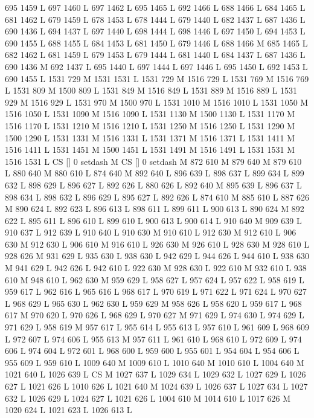 {{{{{{{{{{{{{{{{{{{{{{{{{{{695 1459 L
697 1460 L
697 1462 L
695 1465 L
692 1466 L
688 1466 L
684 1465 L
681 1462 L
679 1459 L
678 1453 L
678 1444 L
679 1440 L
682 1437 L
687 1436 L
690 1436 L
694 1437 L
697 1440 L
698 1444 L
698 1446 L
697 1450 L
694 1453 L
690 1455 L
688 1455 L
684 1453 L
681 1450 L
679 1446 L
688 1466 M 685 1465 L
682 1462 L
681 1459 L
679 1453 L
679 1444 L
681 1440 L
684 1437 L
687 1436 L
690 1436 M 692 1437 L
695 1440 L
697 1444 L
697 1446 L
695 1450 L
692 1453 L
690 1455 L
1531 729 M 1531 1531 L
1531 729 M 1516 729 L
1531 769 M 1516 769 L
1531 809 M 1500 809 L
1531 849 M 1516 849 L
1531 889 M 1516 889 L
1531 929 M 1516 929 L
1531 970 M 1500 970 L
1531 1010 M 1516 1010 L
1531 1050 M 1516 1050 L
1531 1090 M 1516 1090 L
1531 1130 M 1500 1130 L
1531 1170 M 1516 1170 L
1531 1210 M 1516 1210 L
1531 1250 M 1516 1250 L
1531 1290 M 1500 1290 L
1531 1331 M 1516 1331 L
1531 1371 M 1516 1371 L
1531 1411 M 1516 1411 L
1531 1451 M 1500 1451 L
1531 1491 M 1516 1491 L
1531 1531 M 1516 1531 L
CS [] 0 setdash M
CS [] 0 setdash M
872 610 M 879 640 M 879 610 L
880 640 M 880 610 L
874 640 M 892 640 L
896 639 L
898 637 L
899 634 L
899 632 L
898 629 L
896 627 L
892 626 L
880 626 L
892 640 M 895 639 L
896 637 L
898 634 L
898 632 L
896 629 L
895 627 L
892 626 L
874 610 M 885 610 L
887 626 M 890 624 L
892 623 L
896 613 L
898 611 L
899 611 L
900 613 L
890 624 M 892 622 L
895 611 L
896 610 L
899 610 L
900 613 L
900 614 L
910 640 M 909 639 L
910 637 L
912 639 L
910 640 L
910 630 M 910 610 L
912 630 M 912 610 L
906 630 M 912 630 L
906 610 M 916 610 L
926 630 M 926 610 L
928 630 M 928 610 L
928 626 M 931 629 L
935 630 L
938 630 L
942 629 L
944 626 L
944 610 L
938 630 M 941 629 L
942 626 L
942 610 L
922 630 M 928 630 L
922 610 M 932 610 L
938 610 M 948 610 L
962 630 M 959 629 L
958 627 L
957 624 L
957 622 L
958 619 L
959 617 L
962 616 L
965 616 L
968 617 L
970 619 L
971 622 L
971 624 L
970 627 L
968 629 L
965 630 L
962 630 L
959 629 M 958 626 L
958 620 L
959 617 L
968 617 M 970 620 L
970 626 L
968 629 L
970 627 M 971 629 L
974 630 L
974 629 L
971 629 L
958 619 M 957 617 L
955 614 L
955 613 L
957 610 L
961 609 L
968 609 L
972 607 L
974 606 L
955 613 M 957 611 L
961 610 L
968 610 L
972 609 L
974 606 L
974 604 L
972 601 L
968 600 L
959 600 L
955 601 L
954 604 L
954 606 L
955 609 L
959 610 L
1009 640 M 1009 610 L
1010 640 M 1010 610 L
1004 640 M 1021 640 L
1026 639 L
CS M
1027 637 L
1029 634 L
1029 632 L
1027 629 L
1026 627 L
1021 626 L
1010 626 L
1021 640 M 1024 639 L
1026 637 L
1027 634 L
1027 632 L
1026 629 L
1024 627 L
1021 626 L
1004 610 M 1014 610 L
1017 626 M 1020 624 L
1021 623 L
1026 613 L
}}}}}}}}}}}}}}}}}}}}}}}}}}}
